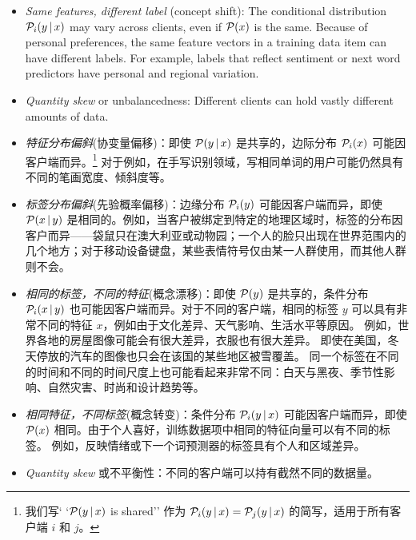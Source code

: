 \begin{itemize}
    \item \emph{Same features, different label} (concept shift): The conditional distribution $\mathcal{P}_i(y \,|\, x)$ may vary across clients, even if $\mathcal{P}(x)$ is the same. Because of personal preferences, the same feature vectors in a training data item can have different labels.  
    For example, labels that reflect sentiment or next word predictors have personal and regional variation.
    
  \item \emph{Quantity skew} or unbalancedness: Different clients can hold vastly different amounts of data.
\end{itemize}

\begin{itemize}
    \item \emph{特征分布偏斜}(协变量偏移)：即使 $\mathcal{P}(y \,|\, x)$ 是共享的，边际分布 $\mathcal{P}_i(x)$ 可能因客户端而异。\footnote{我们写` `$\mathcal{P}(y \,|\, x)$ is shared'' 作为 $\mathcal{P}_i(y \,|\, x) = \mathcal{P}_j(y \,|\, x)$ 的简写，适用于所有客户端 $i$ 和 $j$。} 对于例如，在手写识别领域，写相同单词的用户可能仍然具有不同的笔画宽度、倾斜度等。
    
    \item \emph{标签分布偏斜}(先验概率偏移)：边缘分布 $\mathcal{P}_i(y)$ 可能因客户端而异，即使 $\mathcal{P}(x \,|\, y)$ 是相同的。例如，当客户被绑定到特定的地理区域时，标签的分布因客户而异——袋鼠只在澳大利亚或动物园；一个人的脸只出现在世界范围内的几个地方；对于移动设备键盘，某些表情符号仅由某一人群使用，而其他人群则不会。
    
    \item \emph{相同的标签，不同的特征}(概念漂移)：即使 $\mathcal{P}(y)$ 是共享的，条件分布 $\mathcal{P}_i(x \,|\, y)$ 也可能因客户端而异。对于不同的客户端，相同的标签 $y$ 可以具有非常不同的特征 $x$，例如由于文化差异、天气影响、生活水平等原因。
    例如，世界各地的房屋图像可能会有很大差异，衣服也有很大差异。
    即使在美国，冬天停放的汽车的图像也只会在该国的某些地区被雪覆盖。
    同一个标签在不同的时间和不同的时间尺度上也可能看起来非常不同：白天与黑夜、季节性影响、自然灾害、时尚和设计趋势等。
    
    \item \emph{相同特征，不同标签}(概念转变)：条件分布 $\mathcal{P}_i(y \,|\, x)$ 可能因客户端而异，即使 $\mathcal{P}(x)$ 相同。由于个人喜好，训练数据项中相同的特征向量可以有不同的标签。
    例如，反映情绪或下一个词预测器的标签具有个人和区域差异。
    
  \item \emph{Quantity skew} 或不平衡性：不同的客户端可以持有截然不同的数据量。
\end{itemize}

